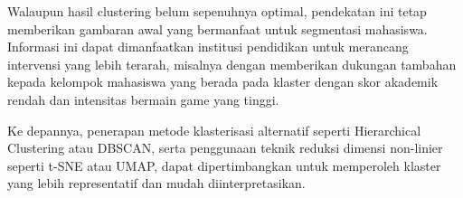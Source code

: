 Walaupun hasil clustering belum sepenuhnya optimal, pendekatan ini tetap memberikan gambaran awal yang bermanfaat untuk segmentasi mahasiswa. Informasi ini dapat dimanfaatkan institusi pendidikan untuk merancang intervensi yang lebih terarah, misalnya dengan memberikan dukungan tambahan kepada kelompok mahasiswa yang berada pada klaster dengan skor akademik rendah dan intensitas bermain game yang tinggi.

Ke depannya, penerapan metode klasterisasi alternatif seperti Hierarchical Clustering atau DBSCAN, serta penggunaan teknik reduksi dimensi non-linier seperti t-SNE atau UMAP, dapat dipertimbangkan untuk memperoleh klaster yang lebih representatif dan mudah diinterpretasikan.
